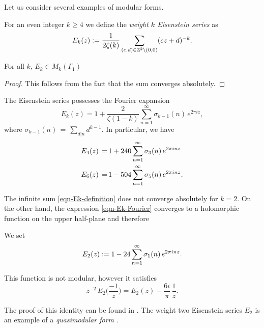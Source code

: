 Let us consider several examples of modular forms.
\begin{definition}\label{def-Ek-definition}%
For an even integer $k\geq 4$ we define the \emph{weight $k$ Eisenstein series} as
\begin{equation}\label{eqn-Ek-definition}
E_k(z):=\frac{1}{2\zeta(k)}\sum_{(c,d)\in\mathbb{Z}^2\backslash(0,0)}(cz+d)^{-k}.\end{equation}
\end{definition}
\begin{lemma}\label{lemma-Ek-is-modular-form}
    For all $k$, $E_k\in M_k(\Gamma_1)$
\end{lemma}
\begin{proof}
    This follows from the fact that the sum converges absolutely.
\end{proof}

\begin{lemma}\label{lemma-Ek-Fourier}
The Eisenstein series possesses the Fourier expansion
\begin{equation}\label{eqn-Ek-Fourier}E_k(z)=1+\frac{2}{\zeta(1-k)}\sum_{n=1}^\infty \sigma_{k-1}(n)\,e^{2\pi i z}, \end{equation}
where $\sigma_{k-1}(n)\,=\,\sum_{d|n} d^{k-1}$. In particular, we have
\begin{align}
  E_4(z)\,=\,& 1+240\sum_{n=1}^\infty \sigma_3(n)\,e^{2\pi i n z} \notag \\
  E_6(z)\,=\,& 1-504\sum_{n=1}^\infty \sigma_5(n)\,e^{2\pi i n z}. \notag
\end{align}
\end{lemma}\label{lemma-E2-not-abs-conv}
The infinite sum \eqref{eqn-Ek-definition} does not converge absolutely for $k=2$. On the other hand, the expression \eqref{eqn-Ek-Fourier} converges to a holomorphic function on the upper half-plane and therefore
\begin{definition}\label{def-E2} %
We set
\begin{equation}E_2(z):= 1-24\sum_{n=1}^\infty \sigma_1(n)\,e^{2\pi i n z}.\notag\end{equation}
\end{definition}
\begin{lemma}\label{lemma-E2-transform}
This function is not modular, however it satisfies
\begin{equation}\label{eqn-E2-transform}z^{-2}\,E_2\Big(\frac{-1}{z}\Big)=E_2(z) -\frac{6i}{\pi}\, \frac{1}{z}.\end{equation}
\end{lemma}
The proof of this identity can be found in \cite[Section~2.3]{1-2-3}.
The weight two Eisenstein series $E_2$ is an example of a \emph{quasimodular form} \cite[Section~5.1]{1-2-3}.


